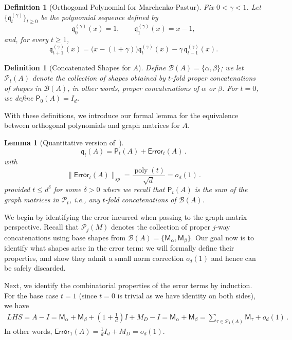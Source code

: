 \documentclass[12pt]{article}
\def \al {\alpha}
\newtheorem{lemma}[theorem]{Lemma}
\newtheorem{definition}[theorem]{Definition}
\newcommand{\poly}{\operatorname{poly}}
\newcommand{\calP}{\mathcal{P}}
\newcommand{\calB}{\mathcal{B}}
\newcommand{\cm}{\mathsf{M} }
\newcommand{\fp}{\mathsf{P}}
\newcommand{\q}{\mathfrak q}
\begin{document}
\begin{definition}[Orthogonal Polynomial for Marchenko-Pastur] \label{def:MP-orthogonal-poly}
Fix \(0<\gamma<1\). Let
\(\{\mathfrak q_t^{(\gamma)}\}_{t\ge 0}\) be the polynomial sequence
defined by
\[
    \mathfrak q_0^{(\gamma)}(x)=1,
    \qquad
    \mathfrak q_1^{(\gamma)}(x)=x-1,
\]
and, for every \(t\ge 1\),
\[
    \mathfrak q_{t+1}^{(\gamma)}(x)
    =
    \bigl(x-(1+\gamma)\bigr)\mathfrak q_t^{(\gamma)}(x)
    -
    \gamma\,\mathfrak q_{t-1}^{(\gamma)}(x).
\]
\end{definition}


\begin{definition}[Concatenated Shapes for $A$]
	Define  $\calB(A) = \{ \al, \beta\}$; we let $\calP_t(A)$ denote the collection of shapes obtained by $t$-fold proper concatenations of shapes in $\calB(A)$, in other words, proper concatenations of $\al$ or $\beta$. For $t=0$, we define $\fp_0(A)=I_d$.
\end{definition}

With these definitions, we introduce our formal lemma for the equivalence between orthogonal polynomials and graph matrices for $A$.
\begin{lemma}[Quantitative version of~]
	\label{lem:mp-error-quant}
	\[ 
	\q_t(A) = \fp_t(A)  + \mathsf{Error}_t(A)\,.
	\]
	with \[ 
	\|\mathsf{Error}_t(A)\|_{sp} = \frac{\poly(t)}{\sqrt{d}} =  o_d(1)\,.
	\]
	provided $t \leq  d^\delta$ for some $\delta>0$ where we recall that $\fp_t(A)$ is the sum of the graph matrices in $\calP_t$, i.e., any $t$-fold concatenations of $\calB(A)$.
	
\end{lemma}

We begin by identifying the error incurred when passing to the graph-matrix perspective. 
Recall that $\calP_j(M)$ denotes the collection of proper $j$-way concatenations using base shapes from $\calB(A) = \{\cm_\al ,\cm_\beta \}$. Our goal now is to identify what shapes arise in the error term:  we will formally define their properties, and show they admit a small norm correction $o_d(1)$  and hence can be safely discarded.

Next, we identify the combinatorial properties of the error terms by induction. For the base case $t=1$ (since $t=0$ is trivial as we have identity on both sides), we have \begin{align*}
	LHS = A - I = \cm_\al + \cm_\beta + (1+\frac{1}{d}) I +M_D  - I = \cm_\al + \cm_\beta =  \sum_{\tau\in \calP_1(A)} \cm_\tau +o_d(1)\,.
\end{align*}
In other words, $\mathsf{Error}_1(A)= \frac{1}{d}I_d + M_D = o_d(1) $.
\end{document}
